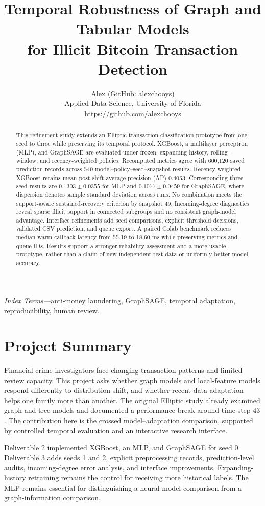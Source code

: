 \documentclass[10pt,twocolumn,letterpaper]{article}
\title{\vspace{-14pt}\fontsize{23}{26}\selectfont Temporal Robustness of Graph and Tabular Models\\for Illicit Bitcoin Transaction Detection}
\author{Alex (GitHub: alexchooys)\\\small Applied Data Science, University of Florida\\\small\url{https://github.com/alexchooys}}
\date{}
\begin{document}
\maketitle
\begin{abstract}
This refinement study extends an Elliptic transaction-classification prototype from one seed to three while preserving its temporal protocol. XGBoost, a multilayer perceptron (MLP), and GraphSAGE are evaluated under frozen, expanding-history, rolling-window, and recency-weighted policies. Recomputed metrics agree with 600,120 saved prediction records across 540 model--policy--seed--snapshot results. Recency-weighted XGBoost retains mean post-shift average precision (AP) 0.4053. Corresponding three-seed results are $0.1303\pm0.0355$ for MLP and $0.1077\pm0.0459$ for GraphSAGE, where dispersion denotes sample standard deviation across runs. No combination meets the support-aware sustained-recovery criterion by snapshot 49. Incoming-degree diagnostics reveal sparse illicit support in connected subgroups and no consistent graph-model advantage. Interface refinements add seed comparisons, explicit threshold decisions, validated CSV prediction, and queue export. A paired Colab benchmark reduces median warm callback latency from 55.19 to 18.60 ms while preserving metrics and queue IDs. Results support a stronger reliability assessment and a more usable prototype, rather than a claim of new independent test data or uniformly better model accuracy.
\end{abstract}
\noindent\textit{Index Terms---}anti-money laundering, GraphSAGE, temporal adaptation, reproducibility, human review.

\section{Project Summary}
Financial-crime investigators face changing transaction patterns and limited review capacity. This project asks whether graph models and local-feature models respond differently to distribution shift, and whether recent-data adaptation helps one family more than another. The original Elliptic study already examined graph and tree models and documented a performance break around time step 43 \cite{elliptic}. The contribution here is the crossed model--adaptation comparison, supported by controlled temporal evaluation and an interactive research interface.

Deliverable 2 implemented XGBoost, an MLP, and GraphSAGE for seed 0. Deliverable 3 adds seeds 1 and 2, explicit preprocessing records, prediction-level audits, incoming-degree error analysis, and interface improvements. Expanding-history retraining remains the control for receiving more historical labels. The MLP remains essential for distinguishing a neural-model comparison from a graph-information comparison.
\end{document}
